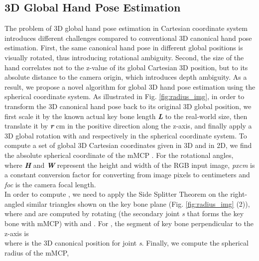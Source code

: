 \documentclass[10pt,twocolumn,letterpaper]{article}
\begin{document}
\subsection{3D Global Hand Pose Estimation}\label{sec:3D_glob}
\indent The problem of 3D global hand pose estimation in Cartesian coordinate system introduces different challenges compared to conventional 3D canonical hand pose estimation. First, the same canonical hand pose in different global positions is visually rotated, thus introducing rotational ambiguity. Second, the size of the hand correlates not to the z-value of its global Cartesian 3D position, but to its absolute distance to the camera origin, which introduces depth ambiguity. As a result, we propose a novel algorithm for global 3D hand pose estimation using the spherical coordinate system. As illustrated in Fig. \ref{fig:radius_img}, in order to transform the 3D canonical hand pose back to its original 3D global position, we first scale it by the known actual key bone length \textbf{\textit{L}} to the real-world size, then translate it by \textbf{\textit{r}} cm in the positive direction along the z-axis, and finally apply a 3D global rotation with  and  respectively in the spherical coordinate system.  To compute a set of global 3D Cartesian coordinates  given  in 3D and  in 2D, we find the absolute spherical coordinate of the mMCP . For the rotational angles, \\

where \textbf{\textit{H}} and \textbf{\textit{W}} represent the height and width of the RGB input image, \textit{pxcm} is a constant conversion factor for converting from image pixels to centimeters and \textit{foc} is the camera focal length.\\
\indent In order to compute , we need to apply the Side Splitter Theorem on the right-angled similar triangles shown on the key bone plane (Fig. \ref{fig:radius_img} (2)), \\

where  and  are computed by rotating  (the secondary joint \textit{s} that forms the key bone with mMCP) with  and . For , the segment of key bone perpendicular to the z-axis is\\

where  is the 3D canonical position for joint \textit{s}. Finally, we compute the spherical radius of the mMCP, \\
\end{document}
